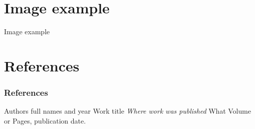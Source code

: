 \documentclass{beamer}
\begin{document}

\section{Image example}
\begin{frame}{Image example}
    \begin{figure}
        \centering
        \label{fig:1}
    \end{figure}
\end{frame}


\section{References}
\begin{frame}
    \frametitle{References}
    \footnotesize{
        \begin{thebibliography}{99} %
             Authors full names and year
            \newblock Work title
            \newblock \emph{Where work was published} What Volume or Pages, publication date.
        \end{thebibliography}
    }
\end{frame}


\begin{frame}
    \titlepage
\end{frame}

\end{document}
